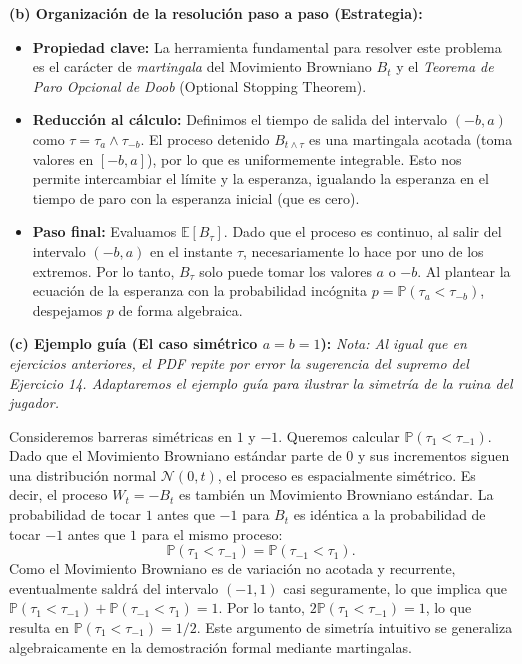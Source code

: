 \documentclass[11pt, letterpaper]{article}
\begin{document}
\begin{solucion}
    \textbf{(b) Organización de la resolución paso a paso (Estrategia):}
    \begin{itemize}
        \item[(i)] \textbf{Propiedad clave:} La herramienta fundamental para resolver este problema es el carácter de \textit{martingala} del Movimiento Browniano $B_t$ y el \textit{Teorema de Paro Opcional de Doob} (Optional Stopping Theorem). 
        \item[(ii)] \textbf{Reducción al cálculo:} Definimos el tiempo de salida del intervalo $(-b, a)$ como $\tau = \tau_a \wedge \tau_{-b}$. El proceso detenido $B_{t \wedge \tau}$ es una martingala acotada (toma valores en $[-b, a]$), por lo que es uniformemente integrable. Esto nos permite intercambiar el límite y la esperanza, igualando la esperanza en el tiempo de paro con la esperanza inicial (que es cero).
        \item[(iii)] \textbf{Paso final:} Evaluamos $\mathbb{E}[B_\tau]$. Dado que el proceso es continuo, al salir del intervalo $(-b, a)$ en el instante $\tau$, necesariamente lo hace por uno de los extremos. Por lo tanto, $B_\tau$ solo puede tomar los valores $a$ o $-b$. Al plantear la ecuación de la esperanza con la probabilidad incógnita $p = \mathbb{P}(\tau_a < \tau_{-b})$, despejamos $p$ de forma algebraica.
    \end{itemize}

    \vspace{3mm}
    \textbf{(c) Ejemplo guía (El caso simétrico $a = b = 1$):}
    \textit{Nota: Al igual que en ejercicios anteriores, el PDF repite por error la sugerencia del supremo del Ejercicio 14. Adaptaremos el ejemplo guía para ilustrar la simetría de la ruina del jugador.}
    
    Consideremos barreras simétricas en $1$ y $-1$. Queremos calcular $\mathbb{P}(\tau_1 < \tau_{-1})$. 
    Dado que el Movimiento Browniano estándar parte de $0$ y sus incrementos siguen una distribución normal $\mathcal{N}(0, t)$, el proceso es espacialmente simétrico. Es decir, el proceso $W_t = -B_t$ es también un Movimiento Browniano estándar.
    La probabilidad de tocar $1$ antes que $-1$ para $B_t$ es idéntica a la probabilidad de tocar $-1$ antes que $1$ para el mismo proceso:
    \[ \mathbb{P}(\tau_1 < \tau_{-1}) = \mathbb{P}(\tau_{-1} < \tau_1). \]
    Como el Movimiento Browniano es de variación no acotada y recurrente, eventualmente saldrá del intervalo $(-1, 1)$ casi seguramente, lo que implica que $\mathbb{P}(\tau_1 < \tau_{-1}) + \mathbb{P}(\tau_{-1} < \tau_1) = 1$.
    Por lo tanto, $2\mathbb{P}(\tau_1 < \tau_{-1}) = 1$, lo que resulta en $\mathbb{P}(\tau_1 < \tau_{-1}) = 1/2$. Este argumento de simetría intuitivo se generaliza algebraicamente en la demostración formal mediante martingalas.


\end{solucion}
\end{document}
